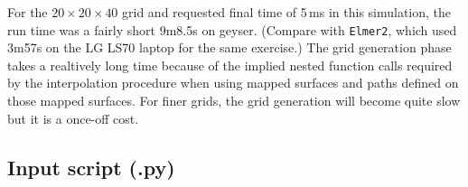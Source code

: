 \medskip
For the $20 \times 20 \times 40$ grid and requested final time of 5\,ms 
in this simulation, the run time was a fairly short 9m8.5s on geyser.
(Compare with \texttt{Elmer2}, which used 3m57s on the LG LS70 laptop for the same exercise.)
The grid generation phase takes a realtively long time because of the implied nested function calls
required by the interpolation procedure when using mapped surfaces and paths 
defined on those mapped surfaces.
For finer grids, the grid generation will become quite slow but it is a
once-off cost.

\newpage
\subsection{Input script (.py)}
\topbar

\bottombar
